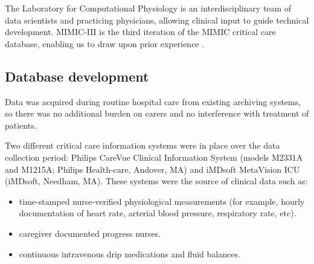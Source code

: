 \documentclass[english]{article}
\begin{document}

The Laboratory for Computational Physiology is an interdisciplinary team of data scientists and practicing physicians, allowing clinical input to guide technical development. MIMIC-III is the third iteration of the MIMIC critical care database, enabling us to draw upon prior experience \cite{cite2}. 

\subsection*{Database development}

Data was acquired during routine hospital care from existing archiving systems, so there was no additional burden on carers and no interference with treatment of patients. 

Two different critical care information systems were in place over the data collection period: Philips CareVue Clinical Information System (models M2331A and M1215A; Philips Health-care, Andover, MA) and iMDsoft MetaVision ICU (iMDsoft, Needham, MA). These systems were the source of clinical data such as: 
\begin{itemize}
  \item time-stamped nurse-verified physiological measurements (for example, hourly documentation of heart rate, arterial blood pressure, respiratory rate, etc).
  \item caregiver documented progress nurses.
  \item continuous intravenous drip medications and fluid balances.
\end{itemize}
\end{document}
